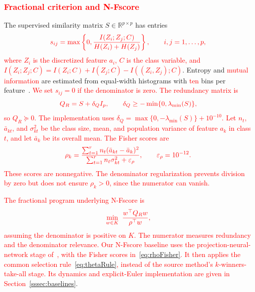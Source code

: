 \documentclass[]{interact}
\theoremstyle{plain}
\theoremstyle{definition}
\theoremstyle{remark}
\newcommand{\R}{\mathbb{R}}
\begin{document}
\subsubsection{\textcolor{red}{Fractional criterion and N-Fscore}}\label{ssec:wang}\label{sssec:wang-inputs}\label{sssec:nfscore}
The supervised similarity matrix $S\in\R^{p\times p}$ has entries
\begin{equation}\label{eq:simMI}\textcolor{red}{
s_{ij}=\max\left\{0,\frac{I(Z_i;Z_j;C)}{H(Z_i)+H(Z_j)}\right\},\qquad i,j=1,\ldots,p,
}\end{equation}
\leavevmode\textcolor{red}{where $Z_i$ is the discretized feature $a_i$, $C$ is the class variable, and $I(Z_i;Z_j;C)=I(Z_i;C)+I(Z_j;C)-I((Z_i,Z_j);C)$}. Entropy and \leavevmode\textcolor{red}{mutual information} are estimated from equal-width histograms with \leavevmode\textcolor{red}{ten} bins per feature~\citep{brown2012}. \leavevmode\textcolor{red}{We set $s_{ij}=0$ if the denominator is zero. The redundancy matrix is}
\begin{equation}\label{eq:matrixQ}\textcolor{red}{
Q_R=S+\delta_QI_p,\qquad \delta_Q\ge-\min\{0,\lambda_{\min}(S)\},
}\end{equation}
\leavevmode\textcolor{red}{so $Q_R\succeq0$. The implementation uses $\delta_Q=\max\{0,-\lambda_{\min}(S)\}+10^{-10}$. Let $n_t$, $\bar a_{kt}$, and $\sigma_{kt}^2$ be the class size, mean, and population variance of feature $a_k$ in class $t$, and let $\bar a_k$ be its overall mean. The Fisher scores are}
\begin{equation}\label{eq:rhoFisher}\textcolor{red}{
\rho_k=\frac{\sum_{t=1}^r n_t(\bar a_{kt}-\bar a_k)^2}{\sum_{t=1}^r n_t\sigma_{kt}^2+\varepsilon_\rho},\qquad \varepsilon_\rho=10^{-12}.
}\end{equation}
\leavevmode\textcolor{red}{These scores are nonnegative. The denominator regularization prevents division by zero but does not ensure $\rho_k>0$, since the numerator can vanish.}

\leavevmode\textcolor{red}{The fractional program underlying N-Fscore is}
\begin{equation}\label{eq:wangOrig}\textcolor{red}{
\min_{w\in K}\ \frac{w^{\top}Q_Rw}{\rho^{\top}w},
}\end{equation}
\leavevmode\textcolor{red}{assuming the denominator is positive on $K$. The numerator measures redundancy and the denominator relevance. Our N-Fscore baseline uses the projection-neural-network stage of~\citep{wang2021fractional}, with the Fisher scores in~\eqref{eq:rhoFisher}. It then applies the common selection rule~\eqref{eq:thetaRule}, instead of the source method's $k$-winners-take-all stage. Its dynamics and explicit-Euler implementation are given in Section~\ref{sssec:baselines}}.
\end{document}
